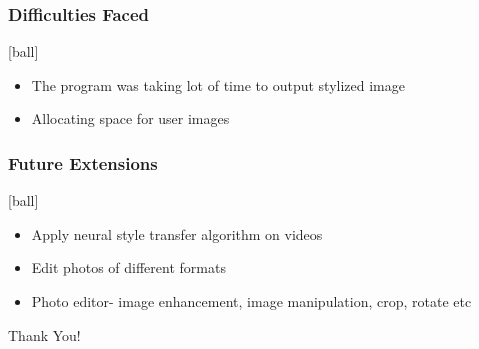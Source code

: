 \documentclass[14pt]{beamer}
\begin{document}
\begin{frame}
		\frametitle{Difficulties Faced}
        \begin{itemize}

				\item The program was taking lot of time to output stylized image
                \item Allocating space for user images
		\end{itemize}
\end{frame}

\begin{frame}
    \frametitle{Future Extensions}
    [ball]
    \begin{itemize}
    \item Apply neural style transfer algorithm on videos
    \item Edit photos of different formats
    \item Photo editor- image enhancement, image manipulation, crop, rotate etc
    \end{itemize}
\end{frame}

\begin{frame}
    \begin{center}  
       \Huge Thank You!
    \end{center}
\end{frame}
\end{document}
